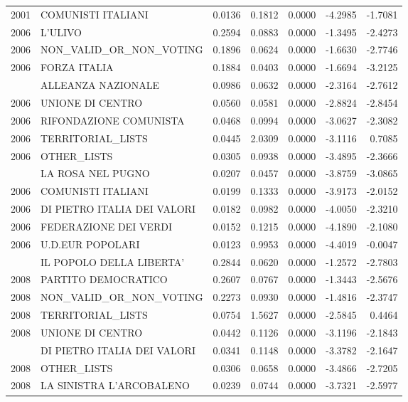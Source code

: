 \begin{longtable}[t]{rlrrrrr}
2001 & COMUNISTI ITALIANI & 0.0136 & 0.1812 & 0.0000 & -4.2985 & -1.7081\\
2006 & L'ULIVO & 0.2594 & 0.0883 & 0.0000 & -1.3495 & -2.4273\\
2006 & NON\_VALID\_OR\_NON\_VOTING & 0.1896 & 0.0624 & 0.0000 & -1.6630 & -2.7746\\
2006 & FORZA ITALIA & 0.1884 & 0.0403 & 0.0000 & -1.6694 & -3.2125\\
\addlinespace
2006 & ALLEANZA NAZIONALE & 0.0986 & 0.0632 & 0.0000 & -2.3164 & -2.7612\\
2006 & UNIONE DI CENTRO & 0.0560 & 0.0581 & 0.0000 & -2.8824 & -2.8454\\
2006 & RIFONDAZIONE COMUNISTA & 0.0468 & 0.0994 & 0.0000 & -3.0627 & -2.3082\\
2006 & TERRITORIAL\_LISTS & 0.0445 & 2.0309 & 0.0000 & -3.1116 & 0.7085\\
2006 & OTHER\_LISTS & 0.0305 & 0.0938 & 0.0000 & -3.4895 & -2.3666\\
\addlinespace
2006 & LA ROSA NEL PUGNO & 0.0207 & 0.0457 & 0.0000 & -3.8759 & -3.0865\\
2006 & COMUNISTI ITALIANI & 0.0199 & 0.1333 & 0.0000 & -3.9173 & -2.0152\\
2006 & DI PIETRO ITALIA DEI VALORI & 0.0182 & 0.0982 & 0.0000 & -4.0050 & -2.3210\\
2006 & FEDERAZIONE DEI VERDI & 0.0152 & 0.1215 & 0.0000 & -4.1890 & -2.1080\\
2006 & U.D.EUR POPOLARI & 0.0123 & 0.9953 & 0.0000 & -4.4019 & -0.0047\\
\addlinespace
2008 & IL POPOLO DELLA LIBERTA' & 0.2844 & 0.0620 & 0.0000 & -1.2572 & -2.7803\\
2008 & PARTITO DEMOCRATICO & 0.2607 & 0.0767 & 0.0000 & -1.3443 & -2.5676\\
2008 & NON\_VALID\_OR\_NON\_VOTING & 0.2273 & 0.0930 & 0.0000 & -1.4816 & -2.3747\\
2008 & TERRITORIAL\_LISTS & 0.0754 & 1.5627 & 0.0000 & -2.5845 & 0.4464\\
2008 & UNIONE DI CENTRO & 0.0442 & 0.1126 & 0.0000 & -3.1196 & -2.1843\\
\addlinespace
2008 & DI PIETRO ITALIA DEI VALORI & 0.0341 & 0.1148 & 0.0000 & -3.3782 & -2.1647\\
2008 & OTHER\_LISTS & 0.0306 & 0.0658 & 0.0000 & -3.4866 & -2.7205\\
2008 & LA SINISTRA L'ARCOBALENO & 0.0239 & 0.0744 & 0.0000 & -3.7321 & -2.5977\\

\end{longtable}
